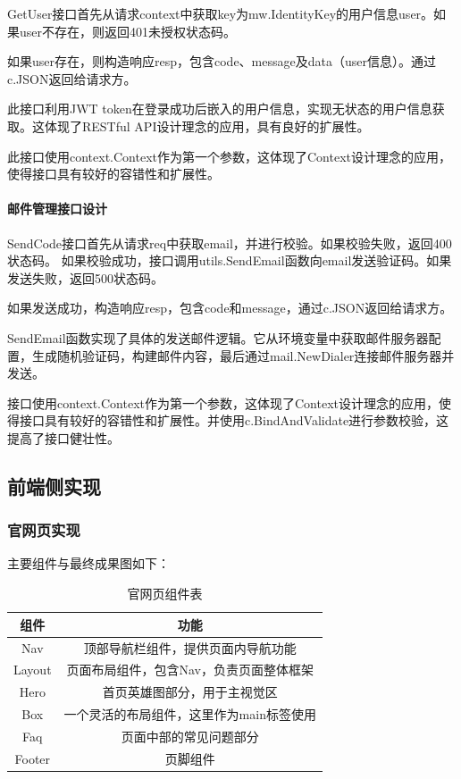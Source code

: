 \documentclass{HDU-Bachelor-Thesis}
\begin{document}
GetUser接口首先从请求context中获取key为mw.IdentityKey的用户信息user。如果user不存在，则返回401未授权状态码。

如果user存在，则构造响应resp，包含code、message及data（user信息）。通过c.JSON返回给请求方。

此接口利用JWT token在登录成功后嵌入的用户信息，实现无状态的用户信息获取。这体现了RESTful API设计理念的应用，具有良好的扩展性。

此接口使用context.Context作为第一个参数，这体现了Context设计理念的应用，使得接口具有较好的容错性和扩展性。

\paragraph{邮件管理接口设计}

SendCode接口首先从请求req中获取email，并进行校验。如果校验失败，返回400状态码。
如果校验成功，接口调用utils.SendEmail函数向email发送验证码。如果发送失败，返回500状态码。

如果发送成功，构造响应resp，包含code和message，通过c.JSON返回给请求方。

SendEmail函数实现了具体的发送邮件逻辑。它从环境变量中获取邮件服务器配置，生成随机验证码，构建邮件内容，最后通过mail.NewDialer连接邮件服务器并发送。

接口使用context.Context作为第一个参数，这体现了Context设计理念的应用，使得接口具有较好的容错性和扩展性。并使用c.BindAndValidate进行参数校验，这提高了接口健壮性。

\subsection{前端侧实现}
\subsubsection{官网页实现}

主要组件与最终成果图如下：

\begin{table}[htbp] 
\caption{官网页组件表}   
\label{table:landingPage}
\centering
\begin{tabular}{c|c}
\hline
\textbf{组件} & \textbf{功能}\\ 
\hline
Nav  & 顶部导航栏组件，提供页面内导航功能\\
\hline
Layout & 页面布局组件，包含Nav，负责页面整体框架\\   
\hline
Hero & 首页英雄图部分，用于主视觉区\\
\hline  
Box & 一个灵活的布局组件，这里作为main标签使用\\
\hline
Faq & 页面中部的常见问题部分\\
\hline
Footer & 页脚组件\\
\hline
\end{tabular}
\end{table}
\end{document}
